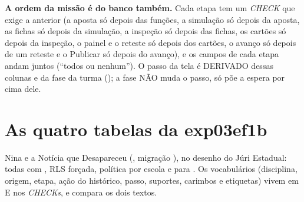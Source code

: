 \begin{regra}
\textbf{A ordem da missão é do banco também.} Cada etapa tem um \emph{CHECK}
que exige a anterior (a aposta só depois das funções, a simulação só depois
da aposta, as fichas só depois da simulação, a inspeção só depois das fichas,
os cartões só depois da inspeção, o painel e o reteste só depois dos cartões,
o avanço só depois de um reteste e o Publicar só depois do avanço), e os
campos de cada etapa andam juntos (\enquote{todos ou nenhum}). O passo da
tela é DERIVADO dessas colunas e da fase da turma ();
a fase NÃO muda o passo, só põe a espera por cima dele.
\end{regra}

\section{As quatro tabelas da exp03ef1b}
\label{sec:tabelas-exp03ef1b}

Nina e a Notícia que Desapareceu (, migração
), no desenho do Júri
Estadual: todas com , RLS forçada, política por escola
e  para . Os vocabulários (disciplina, origem,
etapa, ação do histórico, passo, suportes, carimbos e etiquetas) vivem em
 E nos \emph{CHECKs}, e
 compara os dois textos.


